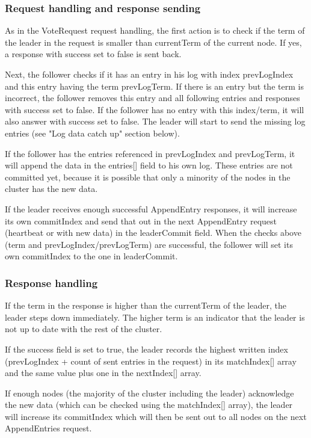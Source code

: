 \subsubsection*{Request handling and response sending}

As in the VoteRequest request handling, the first action is to check if the term of the
leader in the request is smaller than currentTerm of the current node. If yes, a response with success
set to false is sent back.

Next, the follower checks if it has an entry in his log with index prevLogIndex and this entry having the term prevLogTerm.
If there is an entry but the term is incorrect, the follower removes this entry and all following entries and responses
with success set to false. If the follower has no entry with this index/term, it will also answer with success set to false.
The leader will start to send the missing log entries (see "Log data catch up" section below).

If the follower has the entries referenced in prevLogIndex and prevLogTerm, it will append the data in the entries[] field to his
own log. These entries are not committed yet, because it is possible that only a minority of the nodes in the cluster has the new data.

If the leader receives enough successful AppendEntry responses, it will increase its own commitIndex and send that out in the next AppendEntry request (heartbeat or with new data) in the leaderCommit field. When the checks above (term and prevLogIndex/prevLogTerm) are successful, the follower will set its own commitIndex to the one in leaderCommit.

\subsubsection*{Response handling}

If the term in the response is higher than the currentTerm of the leader, the leader steps down immediately. The higher term
is an indicator that the leader is not up to date with the rest of the cluster.

If the success field is set to true, the leader records the highest written index (prevLogIndex + count of sent entries in the request) in its matchIndex[] array and
the same value plus one in the nextIndex[] array.

If enough nodes (the majority of the cluster including the leader) acknowledge the new data (which can be checked using the matchIndex[] array), the leader will increase its commitIndex which will then be sent out to all nodes on the next AppendEntries request.

